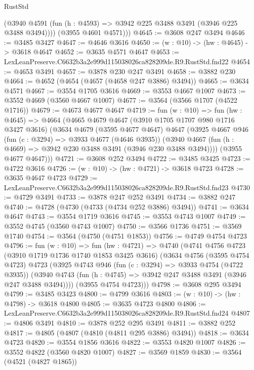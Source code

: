 \begin{lexlean}{RustStd}
\begin{coremodule}
          (@3940 @4591 (fun (h : @4593) => @3942 @225 @3488 @3491 (@3946 @225 @3488 @3494))))
        (@3955 @4601 @4571)))
@4645 := @3608 @247 @3494
@4646 := @3485 @3427
@4647 := @4646 @3616
@4650 := (w : @10) -> (hw : @4645) -> @3618 @4647
@4652 := @3635 @4571 @4647
@4653 := LexLeanPreserve.C6632b3a2e999d115038026ca828209de.R9.RustStd.fnd22
@4654 := @4653 @3491
@4657 := @3878 @230 @247 @3491
@4658 := @3882 @230
@4664 := @4652 (@4654 (@4657 (@4658 @247 @3886) @3494))
@4665 := @3634 @4571
@4667 := @3554 @1705 @3616
@4669 := @3553 @4667 @1007
@4673 := @3552 @4669 (@3560 @4667 @1007)
@4677 := @3564 (@3566 @1707 (@4522 @1716))
@4679 := @4673 @4677 @4647
@4719 := fun (w : @10) =>
  fun (hw : @4645) =>
  @4664
    (@4665
      @4679
      @4647
      (@3910 @1705 @1707 @980 @1716 @3427 @3616)
      (@3634
        @4679
        (@3595 @4677 @4647)
        @4647
        (@3925
          @4667
          @946
          (fun (c : @3294) => @3933 @4677 (@4646 @3935))
          (@3940 @4667 (fun (h : @4669) => @3942 @230 @3488 @3491 (@3946 @230 @3488 @3494))))
        (@3955 @4677 @4647)))
@4721 := @3608 @252 @3494
@4722 := @3485 @3425
@4723 := @4722 @3616
@4726 := (w : @10) -> (hw : @4721) -> @3618 @4723
@4728 := @3635 @4647 @4723
@4729 := LexLeanPreserve.C6632b3a2e999d115038026ca828209de.R9.RustStd.fnd23
@4730 := @4729 @3491
@4733 := @3878 @247 @252 @3491
@4734 := @3882 @247
@4740 := @4728 (@4730 (@4733 (@4734 @252 @3886) @3494))
@4741 := @3634 @4647
@4743 := @3554 @1719 @3616
@4745 := @3553 @4743 @1007
@4749 := @3552 @4745 (@3560 @4743 @1007)
@4750 := @3566 @1736
@4751 := @3569 @1740
@4754 := @3564 (@4750 (@4751 @1853))
@4756 := @4749 @4754 @4723
@4796 := fun (w : @10) =>
  fun (hw : @4721) =>
  @4740
    (@4741
      @4756
      @4723
      (@3910 @1719 @1736 @1740 @1853 @3425 @3616)
      (@3634
        @4756
        (@3595 @4754 @4723)
        @4723
        (@3925
          @4743
          @946
          (fun (c : @3294) => @3933 @4754 (@4722 @3935))
          (@3940 @4743 (fun (h : @4745) => @3942 @247 @3488 @3491 (@3946 @247 @3488 @3494))))
        (@3955 @4754 @4723)))
@4798 := @3608 @295 @3494
@4799 := @3485 @3423
@4800 := @4799 @3616
@4803 := (w : @10) -> (hw : @4798) -> @3618 @4800
@4805 := @3635 @4723 @4800
@4806 := LexLeanPreserve.C6632b3a2e999d115038026ca828209de.R9.RustStd.fnd24
@4807 := @4806 @3491
@4810 := @3878 @252 @295 @3491
@4811 := @3882 @252
@4817 := @4805 (@4807 (@4810 (@4811 @295 @3886) @3494))
@4818 := @3634 @4723
@4820 := @3554 @1856 @3616
@4822 := @3553 @4820 @1007
@4826 := @3552 @4822 (@3560 @4820 @1007)
@4827 := @3569 @1859
@4830 := @3564 (@4521 (@4827 @1865))

\end{coremodule}
\end{lexlean}
